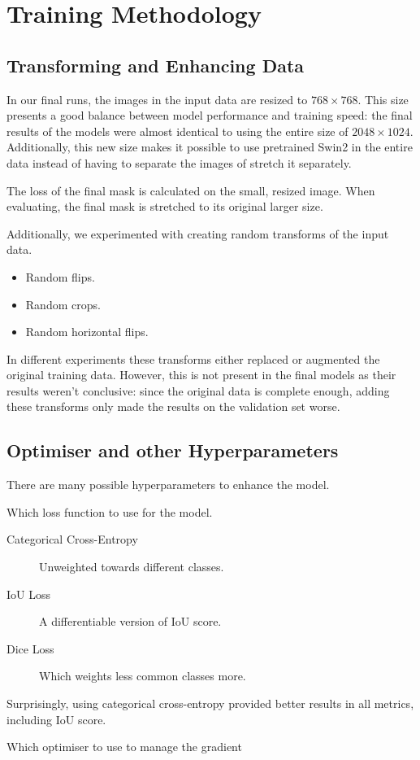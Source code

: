 \section{Training Methodology}

\subsection{Transforming and Enhancing Data}
In our final runs, the images in the input data are resized to $768 \times 768$.
This size presents a good balance between model performance and training speed: the final results of the models were almost identical to using the entire size of $2048 \times 1024$.
Additionally, this new size makes it possible to use pretrained Swin2 in the entire data instead of having to separate the images of stretch it separately.

The loss of the final mask is calculated on the small, resized image.
When evaluating, the final mask is stretched to its original larger size.

Additionally, we experimented with creating random transforms of the input data.
\begin{itemize}
	\item Random flips.
	\item Random crops.
	\item Random horizontal flips.
\end{itemize}

In different experiments these transforms either replaced or augmented the original training data.
However, this is not present in the final models as their results weren't conclusive: since the original data is complete enough, adding these transforms only made the results on the validation set worse.

\subsection{Optimiser and other Hyperparameters}
There are many possible hyperparameters to enhance the model.
\begin{description}[style=nextline]
	\item[Loss Function]
		Which loss function to use for the model.
		\begin{description}
			\item[Categorical Cross-Entropy] Unweighted towards different classes.
			\item[IoU Loss] A differentiable version of IoU score.
			\item[Dice Loss] Which weights less common classes more.
		\end{description}
		Surprisingly, using categorical cross-entropy provided better results in all metrics, including IoU score.
	\item[Optimiser]
		Which optimiser to use to manage the gradient 
\end{description}
